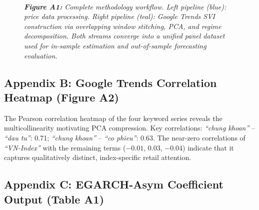 \documentclass[12pt, a4paper]{article}
\begin{document}
\begin{figure}[H]
\smallskip\\
\footnotesize\textit{\textbf{Figure A1:} Complete methodology workflow. Left pipeline (blue): price data
  processing. Right pipeline (teal): Google Trends SVI construction via
  overlapping window stitching, PCA, and regime decomposition. Both streams
  converge into a unified panel dataset used for in-sample estimation and
  out-of-sample forecasting evaluation.}
\end{figure}

\subsection*{Appendix B: Google Trends Correlation Heatmap (Figure A2)}

The Pearson correlation heatmap of the four keyword series reveals the multicollinearity motivating PCA compression. Key correlations: \textit{``chung khoan''} -- \textit{``dau tu''}: 0.71; \textit{``chung khoan''} -- \textit{``co phieu''}: 0.63. The near-zero correlations of \textit{``VN-Index''} with the remaining terms ($-0.01$, $0.03$, $-0.04$) indicate that it captures qualitatively distinct, index-specific retail attention.

\subsection*{Appendix C: EGARCH-Asym Coefficient Output (Table A1)}
\end{document}
